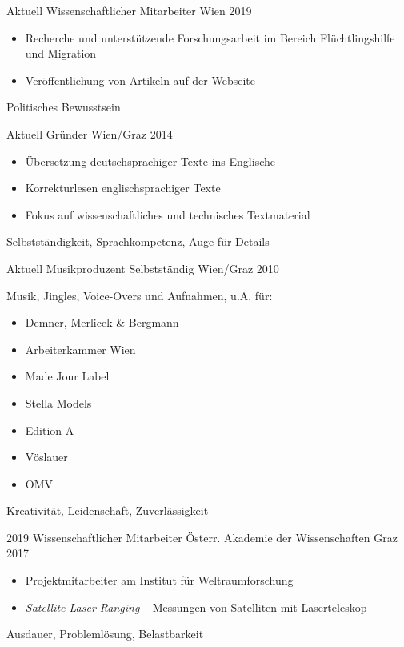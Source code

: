 
\begin{experiences}
	\experience
	{Aktuell}
	{Wissenschaftlicher Mitarbeiter}
	{}
	{Wien}
	{2019}
	{
		\begin{itemize}
			\item Recherche und unterstützende Forschungsarbeit im Bereich
			      Flüchtlingshilfe und Migration
			\item Veröffentlichung von Artikeln auf der Webseite
		\end{itemize}
	}
	{Politisches Bewusstsein}

	\emptySeparator

	\experience
	{Aktuell}
	{Gründer}
	{}
	{Wien/Graz}
	{2014}
	{
		\begin{itemize}
			\item Übersetzung deutschsprachiger Texte ins Englische
			\item Korrekturlesen englischsprachiger Texte
			\item Fokus auf wissenschaftliches und technisches Textmaterial
		\end{itemize}
	}
	{Selbstständigkeit, Sprachkompetenz, Auge für Details}

	\emptySeparator

	\experience
	{Aktuell}
	{Musikproduzent}
	{Selbstständig}
	{Wien/Graz}
	{2010}
	{
		Musik, Jingles, Voice-Overs und Aufnahmen, u.A. für:
		\begin{itemize}
			\item Demner, Merlicek \& Bergmann
			\item Arbeiterkammer Wien
			\item Made Jour Label
			\item Stella Models
			\item Edition A
			\item Vöslauer
			\item OMV
		\end{itemize}
	}
	{Kreativität, Leidenschaft, Zuverlässigkeit}

	\emptySeparator

	\experience
	{2019}
	{Wissenschaftlicher Mitarbeiter}
	{Österr. Akademie der Wissenschaften}
	{Graz}
	{2017}
	{
		\begin{itemize}
			\item Projektmitarbeiter am Institut für Weltraumforschung
			\item \textit{Satellite Laser Ranging} –
			      Messungen von Satelliten mit Laserteleskop
		\end{itemize}
	}
	{Ausdauer, Problemlösung, Belastbarkeit}


\end{experiences}
